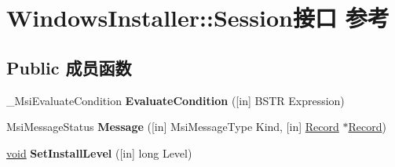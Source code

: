 \hypertarget{interface_windows_installer_1_1_session}{}\section{Windows\+Installer\+:\+:Session接口 参考}
\label{interface_windows_installer_1_1_session}
\subsection*{Public 成员函数}
\begin{DoxyCompactItemize}
\item 
\mbox{\label{interface_windows_installer_1_1_session_a95e2a5695cb5190a5c067c2a8601e56b}} 
\+\_\+\+Msi\+Evaluate\+Condition {\bfseries Evaluate\+Condition} (\mbox{[}in\mbox{]} B\+S\+TR Expression)
\item 
\mbox{\label{interface_windows_installer_1_1_session_ad42504a3d97fbd74edf6ae4b934abd58}} 
Msi\+Message\+Status {\bfseries Message} (\mbox{[}in\mbox{]} Msi\+Message\+Type Kind, \mbox{[}in\mbox{]} \hyperlink{interface_windows_installer_1_1_record}{Record} $\ast$\hyperlink{interface_windows_installer_1_1_record}{Record})
\item 
\mbox{\label{interface_windows_installer_1_1_session_ae1e970c36f8a9a7a6a93419f0983d4c0}} 
\hyperlink{interfacevoid}{void} {\bfseries Set\+Install\+Level} (\mbox{[}in\mbox{]} long Level)
\end{DoxyCompactItemize}
